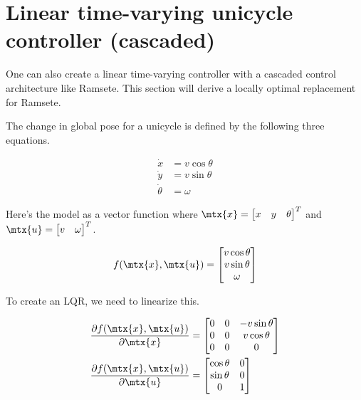 \section{Linear time-varying unicycle controller (cascaded)}

One can also create a linear time-varying controller with a cascaded control
architecture like Ramsete. This section will derive a locally optimal
replacement for Ramsete.

The change in global pose for a unicycle is defined by the following three
equations.

\begin{align*}
  \dot{x} &= v\cos\theta \\
  \dot{y} &= v\sin\theta \\
  \dot{\theta} &= \omega
\end{align*}

Here's the model as a vector function where
$\mtx{x} = \begin{bmatrix} x & y & \theta \end{bmatrix}^T$ and
$\mtx{u} = \begin{bmatrix} v & \omega \end{bmatrix}^T$.

\begin{equation}
  f(\mtx{x}, \mtx{u}) =
  \begin{bmatrix}
    v\cos\theta \\
    v\sin\theta \\
    \omega
  \end{bmatrix}
\end{equation}

To create an LQR, we need to linearize this.

\begin{align*}
  \frac{\partial f(\mtx{x}, \mtx{u})}{\partial\mtx{x}} &=
  \begin{bmatrix}
    0 & 0 & -v\sin\theta \\
    0 & 0 & v\cos\theta \\
    0 & 0 & 0
  \end{bmatrix} \\
  \frac{\partial f(\mtx{x}, \mtx{u})}{\partial\mtx{u}} &=
  \begin{bmatrix}
    \cos\theta & 0 \\
    \sin\theta & 0 \\
    0 & 1
  \end{bmatrix}
\end{align*}

